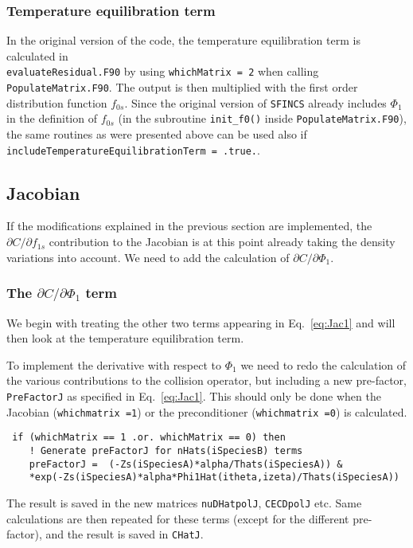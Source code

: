 \documentclass[12pt]{article}
\begin{document}
\subsubsection*{Temperature equilibration term}
In the original version of the code, the temperature equilibration term is calculated in \\ \texttt{evaluateResidual.F90} by using \texttt{whichMatrix = 2} when calling \texttt{PopulateMatrix.F90}. The output is then multiplied with the first order distribution function $f_{0s}$. Since the original version of \texttt{SFINCS} already includes $\Phi_1$ in the definition of $f_{0s}$ (in the subroutine \texttt{init\_f0()} inside \texttt{PopulateMatrix.F90}), the same routines as were presented above can be used also if \texttt{includeTemperatureEquilibrationTerm = .true.}. 

\subsection*{Jacobian}
 If the modifications explained in the previous section are implemented, the $\partial C/\partial f_{1s}$ contribution to the Jacobian is at this point already taking the density variations into account. We need to add the calculation of $\partial C/\partial \Phi_1$.

\subsubsection*{The $\partial C/\partial \Phi_1$ term}
\label{sec:Jac1}
We begin with treating the other two terms appearing in Eq.~\eqref{eq:Jac1} and will then look at the temperature equilibration term. 

To implement the derivative with respect to $\Phi_1$ we need to redo the calculation of the various contributions to the collision operator, but including a new pre-factor, \texttt{PreFactorJ} as specified in Eq.~\eqref{eq:Jac1}. This should only be done when the Jacobian (\texttt{whichmatrix =1}) or the preconditioner (\texttt{whichmatrix =0}) is calculated.

\begin{lstlisting}
 if (whichMatrix == 1 .or. whichMatrix == 0) then
    ! Generate preFactorJ for nHats(iSpeciesB) terms              
    preFactorJ =  (-Zs(iSpeciesA)*alpha/Thats(iSpeciesA)) &
    *exp(-Zs(iSpeciesA)*alpha*Phi1Hat(itheta,izeta)/Thats(iSpeciesA))
\end{lstlisting}

\noindent
The result is saved in the new matrices \texttt{nuDHatpolJ}, \texttt{CECDpolJ} etc. Same calculations are then repeated for these terms (except for the different pre-factor), and the result is saved in \texttt{CHatJ}. 
\end{document}
